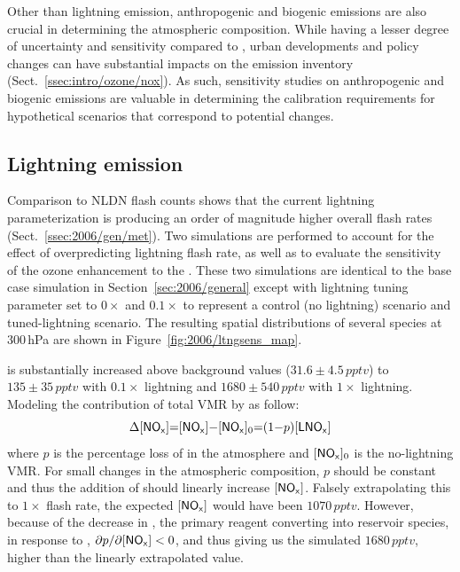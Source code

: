Other than lightning emission, anthropogenic and biogenic emissions are also crucial in determining the atmospheric composition. While having a lesser
degree of uncertainty and sensitivity compared to {\lnox}, urban developments and policy changes can have substantial impacts on the emission inventory
(Sect.~\ref{ssec:intro/ozone/nox}). As such, sensitivity studies on anthropogenic and biogenic emissions are valuable in determining the calibration
requirements for hypothetical scenarios that correspond to potential changes.

\subsection{Lightning emission}\label{ssec:2006/sens/lnox}

Comparison to NLDN flash counts shows that the current lightning parameterization is producing an order of magnitude higher overall flash rates
(Sect.~\ref{ssec:2006/gen/met}). Two simulations are performed to account for the effect of overpredicting lightning flash rate, as well as to evaluate
the sensitivity of the ozone enhancement to the {\lnox}. These two simulations are identical to the base case simulation in Section~\ref{sec:2006/general}
except with lightning tuning parameter set to $0\times$ and $0.1\times$ to represent a control (no lightning) scenario and tuned-lightning scenario. The
resulting spatial distributions of several species at 300\,\unit{hPa} are shown in Figure~\ref{fig:2006/ltngsens_map}.


 is substantially increased above background values ($31.6\pm4.5\,\unit{pptv}$) to $135\pm35\,\unit{pptv}$ with $0.1\times$ lightning and
$1680\pm540\,\unit{pptv}$ with $1\times$ lightning. Modeling the contribution of total  VMR by {\lnox} as follow:
\begin{equation}\label{eqn:nox+lnox}
	\Delta[\chem{NO_x}] = [\chem{NO_x}]-[\chem{NO_x}]_0 = (1-p)[\chem{LNO_x}]
\end{equation}
where $p$ is the percentage loss of {\lnox} in the atmosphere and $[\chem{NO_x}]_0$ is the no-lightning  VMR. For small changes in the
atmospheric composition, $p$ should be constant and thus the addition of {\lnox} should linearly increase $[\chem{NO_x}]$. Falsely extrapolating this
to $1\times$ flash rate, the expected $[\chem{NO_x}]$ would have been $1070\,\unit{pptv}$. However, because of the decrease in , the
primary reagent converting  into reservoir species, in response to {\lnox}, $\partial p/\partial [\chem{NO_x}] < 0$, and thus giving us the
simulated $1680\,\unit{pptv}$, higher than the linearly extrapolated value.

